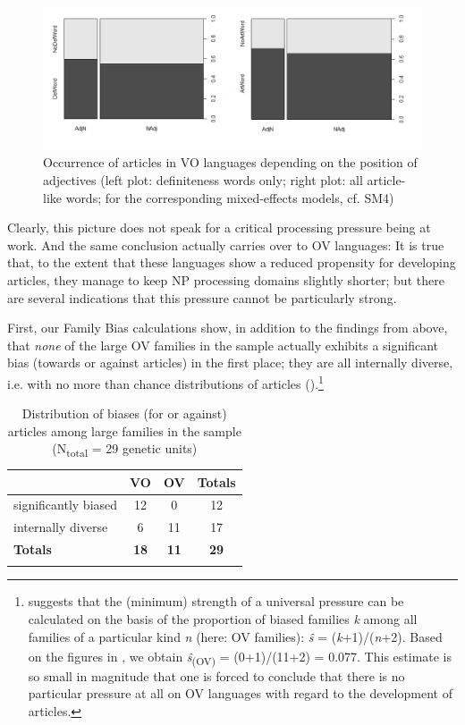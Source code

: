 \documentclass[output=paper]{langsci/langscibook}
\begin{document}
  

\begin{figure}
\includegraphics[width=\textwidth]{figures/schmidtkebode-img4.png}
\caption{Occurrence of articles in VO languages depending on the position of adjectives (left plot: definiteness words only; right plot: all article-like words; for the corresponding mixed-effects models, cf. SM4)}
\label{fig:ksb:4}
\end{figure}

Clearly, this picture does not speak for a critical processing pressure being at work. And the same conclusion actually carries over to OV languages: It is true that, to the extent that these languages show a reduced propensity for developing articles, they manage to keep NP processing domains slightly shorter; but there are several indications that this pressure cannot be particularly strong. 

First, our Family Bias calculations show, in addition to the findings from above, that \textit{none} of the large OV families in the sample actually exhibits a significant bias (towards or against articles) in the first place; they are all internally diverse, i.e. with no more than chance distributions of articles ().\footnote{\citet{Bickel2013} suggests that the (minimum) strength of a universal pressure can be calculated on the basis of the proportion of biased families \textit{k} among all families of a particular kind \textit{n} (here: OV families): \textit{\^s}\textsubscript{} =\textsubscript{} (\textit{k}+1)/(\textit{n}+2). Based on the figures in , we obtain \textit{\^s}\textsubscript{(OV)} = (0+1)/(11+2) = 0.077. This estimate is so small in magnitude that one is forced to conclude that there is no particular pressure at all on OV languages with regard to the development of articles.} 

\begin{table}
\begin{tabularx}{.8\textwidth}{lSSS}
\lsptoprule
& VO & OV &  Totals\\
\midrule
significantly biased & 12 & 0 & 12\\
internally diverse & 6 & 11 & 17\\
\midrule
\textbf{Totals} & \textbf{18} & \textbf{11} & \textbf{29}\\
\lspbottomrule
\end{tabularx}
\caption{Distribution of biases (for or against) articles among large families in the sample (N\textsubscript{total} = 29 genetic units)}
\label{tab:ksb:4}
\end{table}
\end{document}
